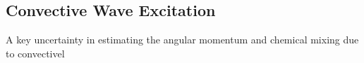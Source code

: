 {\color{purple}
\subsection{Convective Wave Excitation}
}

A key uncertainty in estimating the angular momentum and chemical mixing due to convectivel
